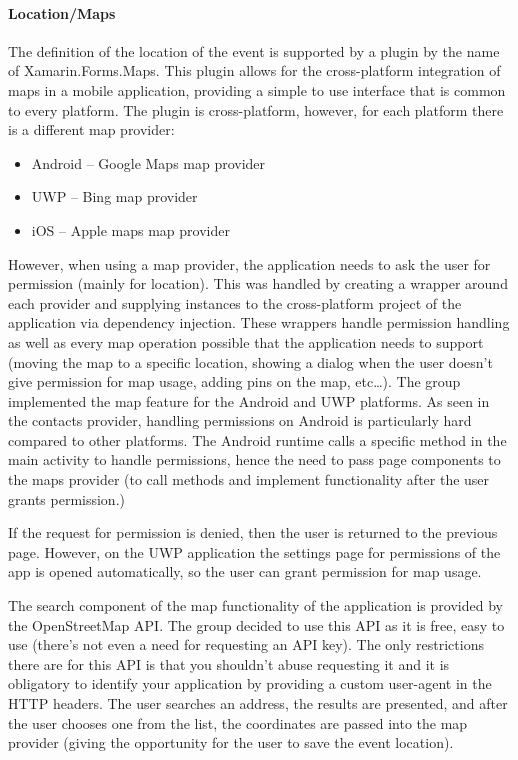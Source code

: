 \paragraph{Location/Maps}

The definition of the location of the event is supported by a plugin by the name of Xamarin.Forms.Maps. This plugin allows for the cross-platform integration of maps in a mobile application, providing a simple to use interface that is common to every platform.
The plugin is cross-platform, however, for each platform there is a different map provider:

\begin{itemize}
	\item Android – Google Maps map provider
	\item UWP – Bing map provider
	\item iOS – Apple maps map provider
\end{itemize}


However, when using a map provider, the application needs to ask the user for permission (mainly for location). This was handled by creating a wrapper around each provider and supplying instances to the cross-platform project of the application via dependency injection.
These wrappers handle permission handling as well as every map operation possible that the application needs to support (moving the map to a specific location, showing a dialog when the user doesn’t give permission for map usage, adding pins on the map, etc…).
The group implemented the map feature for the Android and UWP platforms.
As seen in the contacts provider, handling permissions on Android is particularly hard compared to other platforms. The Android runtime calls a specific method in the main activity to handle permissions, hence the need to pass page components to the maps provider (to call methods and implement functionality after the user grants permission.)

If the request for permission is denied, then the user is returned to the previous page. However, on the UWP application the settings page for permissions of the app is opened automatically, so the user can grant permission for map usage.

The search component of the map functionality of the application is provided by the OpenStreetMap API. The group decided to use this API as it is free, easy to use (there’s not even a need for requesting an API key). The only restrictions there are for this API is that you shouldn’t abuse requesting it and it is obligatory to identify your application by providing a custom user-agent in the HTTP headers. The user searches an address, the results are presented, and after the user chooses one from the list, the coordinates are passed into the map provider (giving the opportunity for the user to save the event location).

